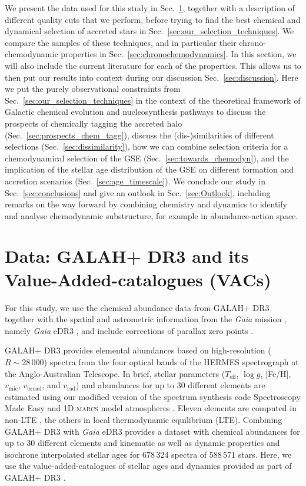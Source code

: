 \documentclass[fleqn,usenatbib]{mnras}
\newcommand{\Gaia}{\textit{Gaia}\xspace} %
\begin{document}
We present the data used for this study in Sec.~\ref{sec:data}, together with a description of different quality cuts that we perform, before trying to find the best chemical and dynamical selection of accreted stars in Sec.~\ref{sec:our_selection_techniques}. We compare the samples of these techniques, and in particular their chrono-chemodynamic properties in Sec.~\ref{sec:chronochemodynamics}. In this section, we will also include the current literature for each of the properties. This allows us to then put our results into context during our discussion Sec.~\ref{sec:discussion}. Here we put the purely observational constraints from Sec.~\ref{sec:our_selection_techniques} in the context of the theoretical framework of Galactic chemical evolution and nucleosynthesis pathways to discuss the prospects of chemically tagging the accreted halo (Sec.~\ref{sec:prospects_chem_tagg}), discuss the (dis-)similarities of different selections (Sec.~\ref{sec:dissimilarity}), how we can combine selection criteria for a chemodynamical selection of the GSE (Sec.~\ref{sec:towards_chemodyn}), and the implication of the stellar age distribution of the GSE on different formation and accretion scenarios (Sec.~\ref{sec:age_timescale}). We conclude our study in Sec.~\ref{sec:conclusions} and give an outlook in Sec.~\ref{sec:Outlook}, including remarks on the way forward by combining chemistry and dynamics to identify and analyse chemodynamic substructure, for example in abundance-action space.

\section{Data: GALAH+ DR3 and its Value-Added-catalogues (VACs)} \label{sec:data}

For this study, we use the chemical abundance data from GALAH+ DR3 \citep{Buder2021} together with the spatial and astrometric information from the \Gaia mission \citep{Gaia-Collaboration2016}, namely \Gaia eDR3 \citep{Brown2021}, and include  corrections of parallax zero points \citep{Lindegren2021a, Lindegren2021b}.

GALAH+ DR3 provides elemental abundances based on high-resolution ($R \sim 28\,000$) spectra from the four optical bands of the HERMES spectrograph \citep{Sheinis2015} at the Anglo-Australian Telescope. In brief, stellar parameters ($T_\text{eff}$, $\log g$, [Fe/H], $v_\text{mic}$, $v_\text{broad}$, and $v_\text{rad}$) and abundances for up to 30 different elements are estimated using our modified version of the spectrum synthesis code Spectroscopy Made Easy \citep[\textsc{sme}][]{Valenti1996, Piskunov2017} and 1D \textsc{marcs} model atmospheres \citep{Gustafsson2008}. Eleven elements are computed in non-LTE \citep{Amarsi2020}, the others in local thermodynamic equilibrium (LTE). Combining GALAH+ DR3 with \Gaia eDR3 provides a dataset with chemical abundances for up to 30 different elements and kinematic as well as dynamic properties and isochrone interpolated stellar ages for 678\,324 spectra of 588\,571 stars. Here, we use the value-added-catalogues of stellar ages and dynamics provided as part of GALAH+ DR3 \citep{Buder2021}.
\end{document}
